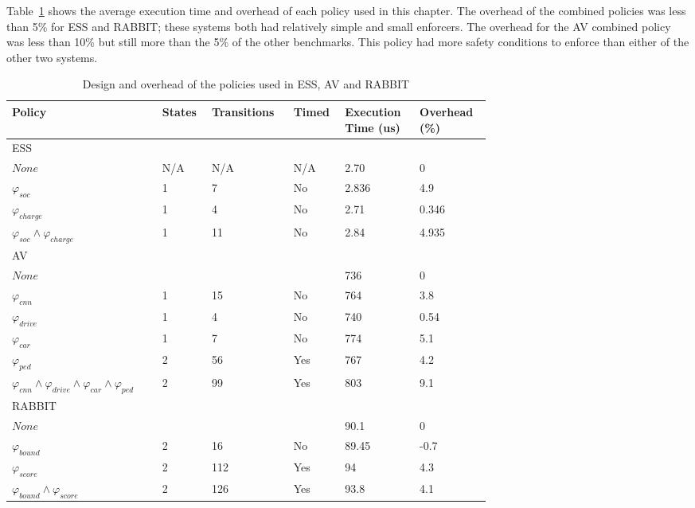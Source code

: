 Table~\ref{table:policies} shows the average execution time and overhead of each policy used in this chapter.
The overhead of the combined policies was less than 5\% for \ac{ESS} and RABBIT; these systems both had relatively simple and small enforcers.
The overhead for the \ac{AV} combined policy was less than 10\% but still more than the 5\% of the other benchmarks.
This policy had more safety conditions to enforce than either of the other two systems.

\begin{table}[H]
	\centering
	\caption{Design and overhead of the policies used in \ac{ESS}, \ac{AV} and RABBIT}
	\label{table:policies}
	\begin{tabular}{|p{0.25\linewidth}|p{0.06\linewidth}|p{0.12\linewidth}|p{0.06\linewidth}|p{0.11\linewidth}|p{0.1\linewidth}|}
		\hline Policy & States & Transitions & Timed & Execution Time (us) & Overhead (\%) \\ \hline
		\multicolumn{6}{|p{0.70\linewidth}|}{\ac{ESS}} \\ \hline 
		$None$ 										& N/A & N/A & N/A & 2.70 & 0 \\ 	
		$\varphi_{soc}$    							& 1 & 7 & No & 2.836 & 4.9 \\
		$\varphi_{charge}$    						& 1 & 4 & No & 2.71 & 0.346 \\
		$\varphi_{soc} \wedge \varphi_{charge}$  	& 1 & 11 & No & 2.84 & 4.935 \\ \hline       
		\multicolumn{6}{|p{0.70\linewidth}|}{\ac{AV}} \\ \hline
		$None$ 						&  &  &  & 736 & 0 \\
		$\varphi_{cnn}$ 			& 1 & 15 & No & 764 & 3.8 \\
		$\varphi_{drive}$ 			& 1 & 4 & No & 740 & 0.54 \\
		$\varphi_{car}$ 			& 1 & 7 & No & 774 & 5.1 \\
		$\varphi_{ped}$ 			& 2 & 56 & Yes & 767 & 4.2 \\
		$\varphi_{cnn} \wedge \varphi_{drive} \wedge \varphi_{car} \wedge \varphi_{ped}$ 	
		& 2 & 99 & Yes & 803 & 9.1 \\ \hline       
		\multicolumn{6}{|p{0.70\linewidth}|}{RABBIT} \\ \hline
		$None$ 										&  &  &  & 90.1 & 0 \\ 
		$\varphi_{bound}$ 							& 2 & 16 & No & 89.45 & -0.7 \\
		$\varphi_{score}$ 							& 2 & 112 & Yes & 94 & 4.3 \\
		$\varphi_{bound} \wedge \varphi_{score}$ 	& 2 & 126 & Yes & 93.8 & 4.1 \\ \hline      
	\end{tabular}
\end{table}

